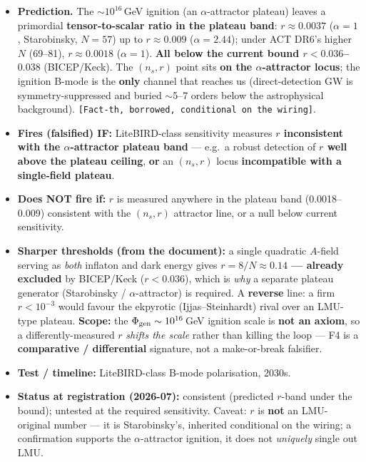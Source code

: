 \documentclass[11pt,a4paper]{article}
\newcommand{\st}[1]{\texttt{[#1]}}
\begin{document}
\begin{itemize}
\item \textbf{Prediction.} The $\sim$$10^{16}$\,GeV ignition (an $\alpha$-attractor plateau) leaves a primordial \textbf{tensor-to-scalar ratio in the plateau band}: \textbf{$r\approx0.0037$} ($\alpha=1$, Starobinsky, $N=57$) up to \textbf{$r\approx0.009$} ($\alpha=2.44$); under ACT DR6's higher $N$ (69--81), \textbf{$r\approx0.0018$} ($\alpha=1$). \textbf{All below the current bound $r<0.036$--$0.038$} (BICEP/Keck). The $(n_s,r)$ point sits \textbf{on the $\alpha$-attractor locus}; the ignition B-mode is the \textbf{only} channel that reaches us (direct-detection GW is symmetry-suppressed and buried $\sim$5--7 orders below the astrophysical background). \st{Fact-th, borrowed, conditional on the wiring}.
\item \textbf{Fires (falsified) IF:} LiteBIRD-class sensitivity measures \textbf{$r$ inconsistent with the $\alpha$-attractor plateau band} --- e.g.\ a robust detection of \textbf{$r$ well above the plateau ceiling}, \textbf{or} an $(n_s,r)$ locus \textbf{incompatible with a single-field plateau}.
\item \textbf{Does NOT fire if:} $r$ is measured anywhere in the plateau band (0.0018--0.009) consistent with the $(n_s,r)$ attractor line, or a null below current sensitivity.
\item \textbf{Sharper thresholds (from the document):} a single quadratic $A$-field serving as \emph{both} inflaton and dark energy gives \textbf{$r=8/N\approx0.14$ --- already excluded} by BICEP/Keck ($r<0.036$), which is \emph{why} a separate plateau generator (Starobinsky / $\alpha$-attractor) is required. A \textbf{reverse} line: a firm \textbf{$r<10^{-3}$} would favour the ekpyrotic (Ijjas--Steinhardt) rival over an LMU-type plateau. \textbf{Scope:} the $\Phi_{\rm gen}\sim10^{16}$\,GeV ignition scale is \textbf{not an axiom}, so a differently-measured $r$ \emph{shifts the scale} rather than killing the loop --- F4 is a \textbf{comparative / differential} signature, not a make-or-break falsifier.
\item \textbf{Test / timeline:} LiteBIRD-class B-mode polarisation, 2030s.
\item \textbf{Status at registration (2026-07):} consistent (predicted $r$-band under the bound); untested at the required sensitivity. Caveat: $r$ is \textbf{not} an LMU-original number --- it is Starobinsky's, inherited conditional on the wiring; a confirmation supports the $\alpha$-attractor ignition, it does not \emph{uniquely} single out LMU.
\end{itemize}
\end{document}
